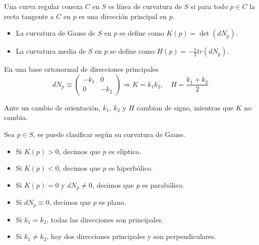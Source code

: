 \begin{definition}
    Una curva regular conexa $C$ en $S$ es línea de curvatura de $S$ si para todo $p \in C$ la recta tangente a $C$ en $p$ es una dirección principal en $p$.
\end{definition}

\begin{definition}
    \hfill
    \begin{itemize}
        \item La curvatura de Gauss de $S$ en $p$ se define como $K(p) = \det(dN_p)$.
        \item La curvatura media de $S$ en $p$ se define como $H(p) = -\frac{1}{2} tr(dN_p)$.
    \end{itemize}
\end{definition}

\begin{remark}
    En una base ortonormal de direcciones principales
    $$dN_p \equiv
        \begin{pmatrix}
            -k_1 & 0    \\
            0    & -k_2
        \end{pmatrix} \Rightarrow
        K = k_1 k_2, \quad H = \frac{k_1+k_2}{2}$$
\end{remark}

\begin{remark}
    Ante un cambio de orientación, $k_1$, $k_2$ y $H$ cambian de signo, mientras que $K$ no cambia.
\end{remark}

\begin{definition}
    Sea $p \in S$, se puede clasificar según su curvatura de Gauss.
    \begin{itemize}
        \item Si $K(p) > 0$, decimos que $p$ es elíptico.
        \item Si $K(p) < 0$, decimos que $p$ es hiperbólico.
        \item Si $K(p) = 0$ y $dN_p \neq 0$, decimos que $p$ es parabólico.
        \item Si $dN_p \equiv 0$, decimos que $p$ es plano.
    \end{itemize}
\end{definition}

\begin{remark}
    \hfill
    \begin{itemize}
        \item Si $k_1 = k_2$, todas las direcciones son principales.
        \item Si $k_1 \neq k_2$, hay dos direcciones principales y son perpendiculares.
    \end{itemize}
\end{remark}

